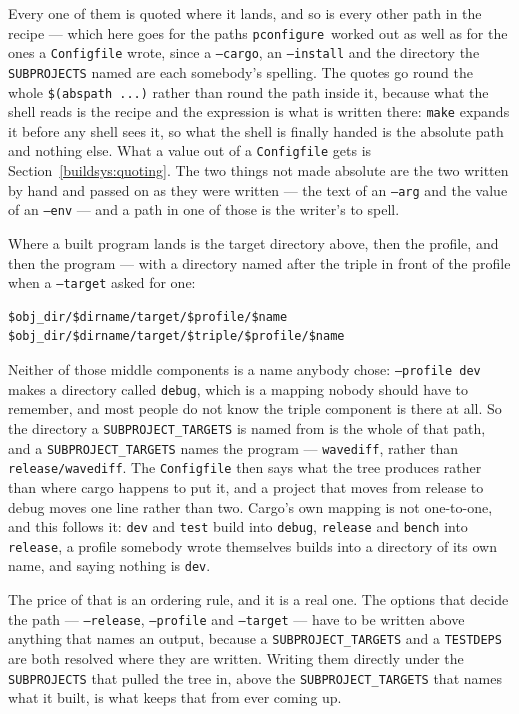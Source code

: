 \documentclass{article}
\newcommand{\pconfigure}{\texttt{pconfigure}}
\begin{document}
Every one of them is quoted where it lands, and so is every other
path in the recipe --- which here goes for the paths \pconfigure\
worked out as well as for the ones a \texttt{Configfile} wrote, since
a \texttt{--cargo}, an \texttt{--install} and the directory the
\texttt{SUBPROJECTS} named are each somebody's spelling.  The quotes
go round the whole \texttt{\$(abspath ...)} rather than round the
path inside it, because what the shell reads is the recipe and the
expression is what is written there: \texttt{make} expands it before
any shell sees it, so what the shell is finally handed is the absolute
path and nothing else.  What a value out of a \texttt{Configfile}
gets is Section~\ref{buildsys:quoting}.  The two things not made
absolute are the two written by hand and passed on as they were
written --- the text of an \texttt{--arg} and the value of an
\texttt{--env} --- and a path in one of those is the writer's to
spell.

Where a built program lands is the target directory above, then the
profile, and then the program --- with a directory named after the
triple in front of the profile when a \texttt{--target} asked for one:

\begin{verbatim}
$obj_dir/$dirname/target/$profile/$name
$obj_dir/$dirname/target/$triple/$profile/$name
\end{verbatim}

Neither of those middle components is a name anybody chose: \texttt{--profile
dev} makes a directory called \texttt{debug}, which is a mapping
nobody should have to remember, and most people do not know the triple
component is there at all.  So the directory a
\texttt{SUBPROJECT\_TARGETS} is named from is the whole of that path,
and a \texttt{SUBPROJECT\_TARGETS} names the program ---
\texttt{wavediff}, rather than \texttt{release/wavediff}.  The
\texttt{Configfile} then says what the tree produces rather than where
cargo happens to put it, and a project that moves from release to
debug moves one line rather than two.  Cargo's own mapping is not
one-to-one, and this follows it: \texttt{dev} and \texttt{test} build
into \texttt{debug}, \texttt{release} and \texttt{bench} into
\texttt{release}, a profile somebody wrote themselves builds into a
directory of its own name, and saying nothing is \texttt{dev}.

The price of that is an ordering rule, and it is a real one.  The
options that decide the path --- \texttt{--release},
\texttt{--profile} and \texttt{--target} --- have to be written above
anything that names an output, because a \texttt{SUBPROJECT\_TARGETS}
and a \texttt{TESTDEPS} are both resolved where they are written.
Writing them directly under the \texttt{SUBPROJECTS} that pulled the
tree in, above the \texttt{SUBPROJECT\_TARGETS} that names what it
built, is what keeps that from ever coming up.
\end{document}
